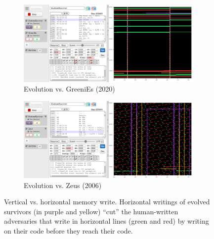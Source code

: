 \documentclass[dvipsnames, format=sigconf]{acmart}
\begin{document}
\begin{figure}
  \centering
  \begin{subfigure}{0.45\textwidth}
    \includegraphics[width=\linewidth]{images/Greenies_vertical.png}
    \caption{Evolution vs. GreeniEs (2020)}
    \label{fig:mem_after2}
  \end{subfigure}
  \hfill
  \begin{subfigure}{0.45\textwidth}
    \includegraphics[width=\linewidth]{images/zeus_after_mem.png}
    \caption{Evolution vs. Zeus (2006)}
    \label{fig:mem_after1}
  \end{subfigure}
  \caption{Vertical vs. horizontal memory write. Horizontal writings of evolved survivors (in purple and yellow) ``cut'' the human-written adversaries that write in horizontal lines (green and red) by writing on their code before they reach their code.}
  \label{fig:vertical}
\end{figure}
\end{document}
